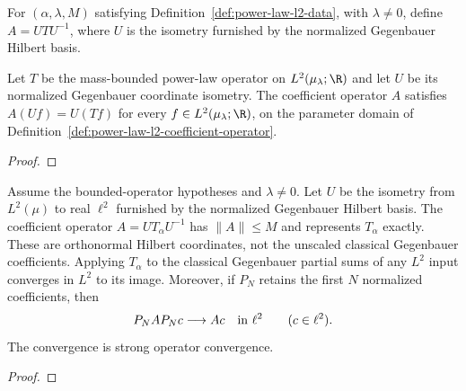 \begin{supporting}
\begin{definition}
\label{def:power-law-l2-coefficient-operator}
\leanok
For $(\alpha,\lambda,M)$ satisfying Definition~\ref{def:power-law-l2-data}, with $\lambda\ne0$, define $A=UTU^{-1}$,
where $U$ is the isometry furnished by the normalized Gegenbauer Hilbert basis.
\end{definition}
\begin{theorem}
\label{thm:power-law-l2-coefficient-operator}
\leanok
Let $T$ be the mass-bounded power-law operator on $L^2(\mu_\lambda;\R)$
and let $U$ be its normalized Gegenbauer coordinate isometry.
The coefficient operator $A$ satisfies $A(Uf)=U(Tf)$ for every
$f\in L^2(\mu_\lambda;\R)$, on the parameter domain of
Definition~\ref{def:power-law-l2-coefficient-operator}.
\end{theorem}
\begin{proof}
\leanok
\end{proof}

\begin{theorem}
\label{thm:power-law-l2-coefficients}
\leanok
Assume the bounded-operator hypotheses and $\lambda\ne0$. Let $U$ be the
isometry from $L^2(\mu)$ to real $\ell^2$ furnished by the normalized Gegenbauer
Hilbert basis. The coefficient operator $A=UT_\alpha U^{-1}$ has $\|A\|\le M$
and represents $T_\alpha$ exactly. These are orthonormal Hilbert coordinates,
not the unscaled classical Gegenbauer coefficients.
Applying $T_\alpha$ to the classical Gegenbauer partial sums of any $L^2$ input
converges in $L^2$ to its image. Moreover, if $P_N$ retains the first $N$
normalized coefficients, then
\[
 P_N A P_N c\longrightarrow Ac\quad\hbox{in }\ell^2
 \qquad(c\in\ell^2).
\]
The convergence is strong operator convergence.
\end{theorem}
\begin{proof}
\leanok
\end{proof}


\end{supporting}
